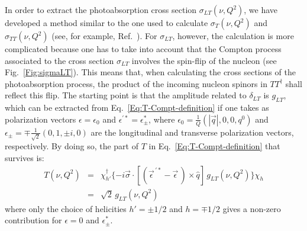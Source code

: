 \documentclass[twocolumn,prc,showpacs,nofootinbib,preprintnumbers,amsmath,amssymb,superscriptaddress]{revtex4-1}
\begin{document}
In order to extract the photoabsorption cross section $\sigma_{LT}(\nu,Q^2)$, we have developed a method similar to the one used to calculate $\sigma_T(\nu,Q^2)$ and $\sigma_{TT}(\nu,Q^2)$ (see, for example, Ref.~\cite{Holstein:2005db}). 
For $\sigma_{LT}$, however, the calculation is more complicated because one has to take into account that the Compton process associated to the cross section $\sigma_{LT}$ involves the spin-flip of the nucleon (see Fig.~\ref{Fig:sigmaLT}). This means that, when calculating the cross sections of the photoabsorption process, the product of the incoming nucleon spinors in $T T^\dagger$ shall reflect this flip. 
The starting point is that the amplitude related to $\delta_{LT}$ is $g_{LT}$, which can be extracted from Eq.~\eqref{Eq:T-Compt-definition} if one takes as polarization vectors $\epsilon=\epsilon_0$ and $\epsilon^{'*}=\epsilon^*_\pm$, where $\epsilon_0=\frac{1}{Q}(|\vec{q}|,0,0,q^0)$ and $\epsilon_{\pm}=\mp\frac{1}{\sqrt{2}}(0,1,\pm i , 0)$ are the longitudinal and transverse polarization vectors, respectively. 
By doing so, the part of $T$ in Eq.~\eqref{Eq:T-Compt-definition} that survives is: 
\begin{eqnarray}\label{Eq:Derivation-LT1}
T(\nu,Q^2)&=& \chi^\dagger_{h'} \{- i \vec{\sigma}\cdot [(\vec{\epsilon}^{\, \prime *} - \vec{\epsilon}\,)\times \hat{q}] \, g_{LT}(\nu,Q^2)\} \chi_h \nonumber\\
&=& \sqrt{2}\, g_{LT}(\nu,Q^2)
\end{eqnarray}
where only the choice of helicities $h'=\pm1/2$ and $h=\mp 1/2$  gives a non-zero contribution for $\epsilon=0$ and $\epsilon^*_\pm$. 
\end{document}

